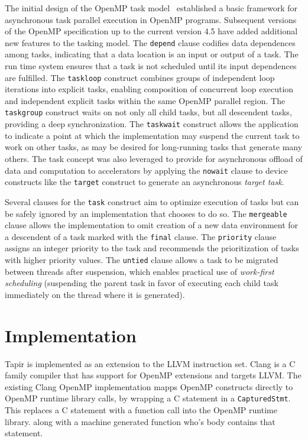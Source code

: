 \documentclass[sigconf]{acmart}
\begin{document}
The initial design of the OpenMP task model~\cite{ayguade09design} established 
a basic framework for asynchronous task parallel execution in OpenMP programs.
Subsequent versions of the OpenMP specification up to the current version 4.5 
have added additional new features to the tasking model.  The \texttt{depend} 
clause codifies data dependences among tasks, indicating that a data location 
is an input or output of a task.  The run time system ensures that a task is 
not scheduled until its input dependences are fulfilled.  The \texttt{taskloop} 
construct combines groups of independent loop iterations into explicit tasks, 
enabling composition of concurrent loop execution and independent explicit 
tasks within the same OpenMP parallel region. The \texttt{taskgroup} construct 
waits on not only all child tasks, but all descendent tasks, providing a deep 
synchronization. The \texttt{taskwait} construct allows the application to 
indicate a point at which the implementation may suspend the current task to 
work on other tasks, as may be desired for long-running tasks that generate 
many others.  The task concept was also leveraged to provide for asynchronous 
offload of data and computation to accelerators by applying the \texttt{nowait} 
clause to device constructs like the \texttt{target} construct to generate an 
asynchronous \textit{target task}.

Several clauses for the \texttt{task} construct aim to optimize execution of 
tasks but can be safely ignored by an implementation that chooses to do so. 
The \texttt{mergeable} clause allows the implementation to omit creation of a 
new data environment for a descendent of a task marked with the \texttt{final}
clause.  The \texttt{priority} clause assigns an integer priority to the task 
and recommends the prioritization of tasks with higher priority values.
The \texttt{untied} clause allows a task to be migrated between threads after 
suspension, which enables practical use of \textit{work-first scheduling} 
(suspending the parent task in favor of executing each child task immediately 
on the thread where it is generated).

\section{Implementation}

Tapir is implemented as an extension to the LLVM instruction set. Clang is a
C family compiler that has support for OpenMP extensions \cite{clang} and targets
LLVM. The existing Clang OpenMP implementation mapps OpenMP constructs directly
to OpenMP runtime library calls, by wrapping a C statement in a
\texttt{CapturedStmt}.  This replaces a C statement with a function call into
the OpenMP runtime library. along with a machine generated function who's body
contains that statement. 
\end{document}
